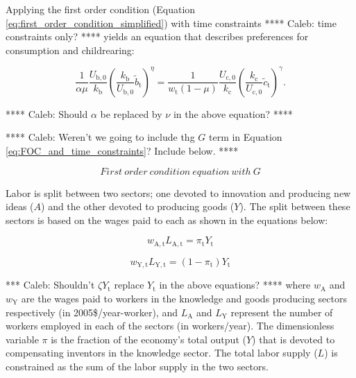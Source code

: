 \documentclass[letterpaper,12pt]{article}
\begin{document}
Applying the first order condition (Equation \ref{eq:first_order_condition_simplified}) with time constraints **** Caleb: time constraints only? **** yields an equation that describes preferences for consumption and childrearing:

\begin{equation} \label{eq:FOC_and_time_constraints}
	\frac{1}{\alpha \mu} \frac{U_\mathrm{b,0}}{k_\mathrm{b}} \left( \frac{k_\mathrm{b}}{U_\mathrm{b,0}} \tilde b_\mathrm{t} \right) ^{\eta} 
	= \frac{1}{w_\mathrm{t}(1-\mu)} \frac{U_\mathrm{c,0}}{k_\mathrm{c}}  \left( \frac{k_\mathrm{c}}{U_\mathrm{c,0}} \tilde c_\mathrm{t} \right)^\gamma .
\end{equation}

**** Caleb: Should $\alpha$ be replaced by $\nu$ in the above equation? **** 

**** Caleb: Weren't we going to include thg $G$ term in Equation \ref{eq:FOC_and_time_constraints}? Include below. ****

\begin{equation} \label{eq:FOC_with_G}
  First~order~condition~equation~with~G
\end{equation}

Labor is split between two sectors; one devoted to innovation and producing new ideas ($A$) and the other devoted to producing goods ($Y$). The split between these sectors is based on the wages paid to each as shown in the equations below:

\begin{equation} \label{eq:knowledge_comp}
	w_\mathrm{A,t} L_\mathrm{A,t} = \pi_\mathrm{t} Y_\mathrm{t}
\end{equation}

\begin{equation} \label{eq:labor_comp}
	w_\mathrm{Y,t} L_\mathrm{Y,t} = (1-\pi_\mathrm{t}) Y_\mathrm{t}
\end{equation}

\noindent **** Caleb: Shouldn't $\zeta Y_\mathrm{t}$ replace $Y_\mathrm{t}$ in the above equations? **** where $w_\mathrm{A}$ and $w_\mathrm{Y}$ are the wages paid to workers in the knowledge and goods producing sectors respectively (in 2005\$/year-worker), and $L_\mathrm{A}$ and $L_\mathrm{Y}$ represent the number of workers employed in each of the sectors (in workers/year). The dimensionless variable $\pi$ is the fraction of the economy's total output ($Y$) that is devoted to compensating inventors in the knowledge sector. The total labor supply ($L$) is constrained as the sum of the labor supply in the two sectors.
\end{document}
